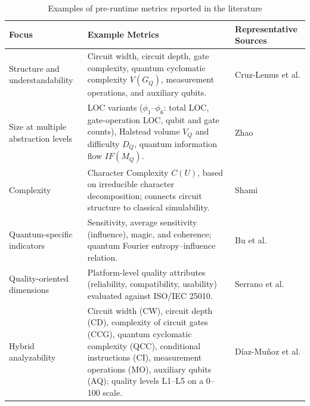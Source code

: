 \documentclass{article}
\begin{document}
\begin{table}[ht]
\renewcommand{\arraystretch}{1.3}
\centering
\caption{Examples of pre-runtime metrics reported in the literature}
\label{tab:preruntime-literature-summary}
\footnotesize
\begin{tabular}{|p{2cm}|p{6cm}|p{2.8cm}|}
\hline
\textbf{Focus} & \textbf{Example Metrics} & \textbf{Representative Sources} \\
\hline
Structure and understandability & Circuit width, circuit depth, gate complexity, quantum cyclomatic complexity $V(G_Q)$, measurement operations, and auxiliary qubits. & Cruz-Lemus et al. \cite{josecruzTowards, cruz-lemusQuantumSoftwareQuality_2024} \\
\hline
Size at multiple abstraction levels & LOC variants ($\phi_1$--$\phi_6$: total LOC, gate-operation LOC, qubit and gate counts), Halstead volume $V_Q$ and difficulty $D_Q$, quantum information flow $IF(M_Q)$. & Zhao \cite{Zhao_2021} \\
\hline
Complexity & Character Complexity $C(U)$, based on irreducible character decomposition; connects circuit structure to classical simulability. & Shami \cite{shamiCharacterComplexityNovel_2024} \\
\hline
Quantum-specific indicators & Sensitivity, average sensitivity (influence), magic, and coherence; quantum Fourier entropy--influence relation. & Bu et al. \cite{buComplexityQuantumCircuits_2024} \\
\hline
Quality-oriented dimensions & Platform-level quality attributes (reliability, compatibility, usability) evaluated against ISO/IEC 25010. & Serrano et al. \cite{Serrano2022} \\
\hline
Hybrid analyzability & Circuit width (CW), circuit depth (CD), complexity of circuit gates (CCG), quantum cyclomatic complexity (QCC), conditional instructions (CI), measurement operations (MO), auxiliary qubits (AQ); quality levels L1--L5 on a 0--100 scale. & Díaz-Muñoz et al. \cite{diazMunozEnvironmentEvaluation_2025} \\
\hline
\end{tabular}
\end{table}
\end{document}
